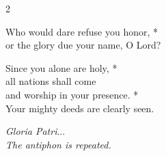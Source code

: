 \begin{multicols}{2}



    
    Who would dare refuse you honor, *\\
    or the glory due your name, O Lord?
    
    Since you alone are holy, *\\
    all nations shall come\\
    and worship in your presence. *\\
    Your mighty deeds are clearly seen.
    


    \emph{Gloria Patri}...\\
    \emph{The antiphon is repeated.}
\end{multicols}

